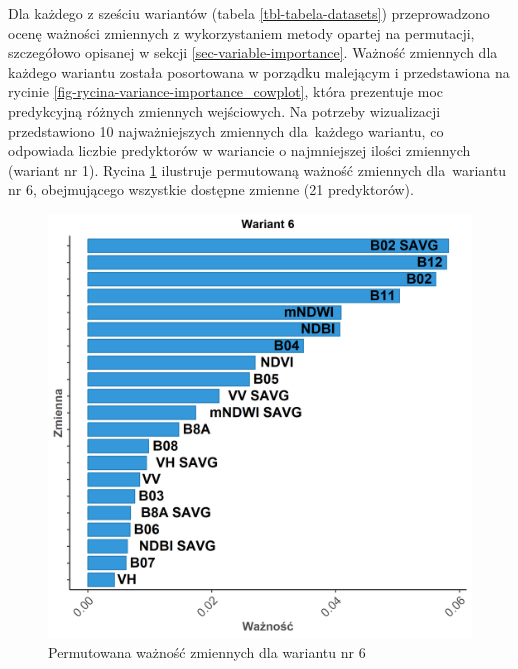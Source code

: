 \documentclass{amuthesis}
\begin{document}
Dla każdego z sześciu wariantów (tabela \ref{tbl-tabela-datasets})
przeprowadzono ocenę ważności zmiennych z wykorzystaniem metody opartej
na permutacji, szczegółowo opisanej w sekcji
\ref{sec-variable-importance}. Ważność zmiennych dla każdego wariantu
została posortowana w porządku malejącym i przedstawiona na rycinie
\ref{fig-rycina-variance-importance_cowplot}, która prezentuje moc
predykcyjną różnych zmiennych wejściowych. Na potrzeby wizualizacji
przedstawiono 10 najważniejszych zmiennych dla~każdego wariantu, co
odpowiada liczbie predyktorów w wariancie o najmniejszej ilości
zmiennych (wariant nr 1). Rycina
\ref{fig-rycina-variance-importance-dataset6} ilustruje permutowaną
ważność zmiennych dla~wariantu nr 6, obejmującego wszystkie dostępne
zmienne (21 predyktorów).

\begin{figure}[t]

{\centering \includegraphics[width=4.6875in,height=\textheight]{figures/importance_plot_dataset6_pl.png}

}

\caption{\label{fig-rycina-variance-importance-dataset6}Permutowana
ważność zmiennych dla wariantu nr 6}

\end{figure}
\end{document}
